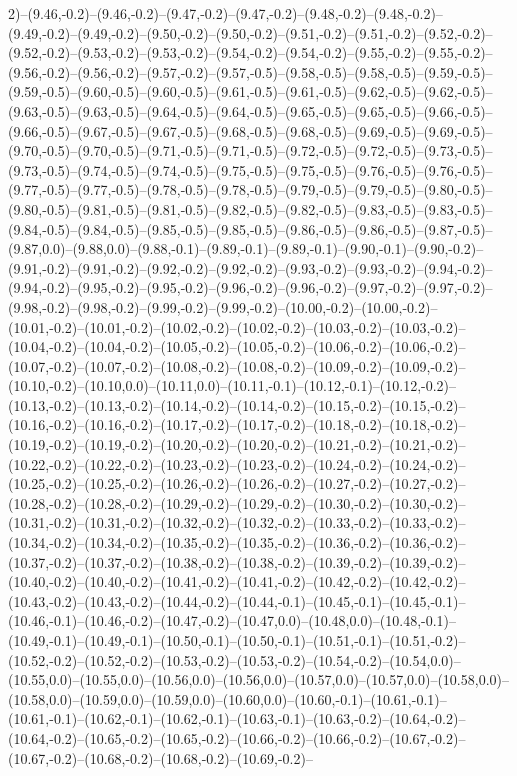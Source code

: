 2)--(9.46,-0.2)--(9.46,-0.2)--(9.47,-0.2)--(9.47,-0.2)--(9.48,-0.2)--(9.48,-0.2)--(9.49,-0.2)--(9.49,-0.2)--(9.50,-0.2)--(9.50,-0.2)--(9.51,-0.2)--(9.51,-0.2)--(9.52,-0.2)--(9.52,-0.2)--(9.53,-0.2)--(9.53,-0.2)--(9.54,-0.2)--(9.54,-0.2)--(9.55,-0.2)--(9.55,-0.2)--(9.56,-0.2)--(9.56,-0.2)--(9.57,-0.2)--(9.57,-0.5)--(9.58,-0.5)--(9.58,-0.5)--(9.59,-0.5)--(9.59,-0.5)--(9.60,-0.5)--(9.60,-0.5)--(9.61,-0.5)--(9.61,-0.5)--(9.62,-0.5)--(9.62,-0.5)--(9.63,-0.5)--(9.63,-0.5)--(9.64,-0.5)--(9.64,-0.5)--(9.65,-0.5)--(9.65,-0.5)--(9.66,-0.5)--(9.66,-0.5)--(9.67,-0.5)--(9.67,-0.5)--(9.68,-0.5)--(9.68,-0.5)--(9.69,-0.5)--(9.69,-0.5)--(9.70,-0.5)--(9.70,-0.5)--(9.71,-0.5)--(9.71,-0.5)--(9.72,-0.5)--(9.72,-0.5)--(9.73,-0.5)--(9.73,-0.5)--(9.74,-0.5)--(9.74,-0.5)--(9.75,-0.5)--(9.75,-0.5)--(9.76,-0.5)--(9.76,-0.5)--(9.77,-0.5)--(9.77,-0.5)--(9.78,-0.5)--(9.78,-0.5)--(9.79,-0.5)--(9.79,-0.5)--(9.80,-0.5)--(9.80,-0.5)--(9.81,-0.5)--(9.81,-0.5)--(9.82,-0.5)--(9.82,-0.5)--(9.83,-0.5)--(9.83,-0.5)--(9.84,-0.5)--(9.84,-0.5)--(9.85,-0.5)--(9.85,-0.5)--(9.86,-0.5)--(9.86,-0.5)--(9.87,-0.5)--(9.87,0.0)--(9.88,0.0)--(9.88,-0.1)--(9.89,-0.1)--(9.89,-0.1)--(9.90,-0.1)--(9.90,-0.2)--(9.91,-0.2)--(9.91,-0.2)--(9.92,-0.2)--(9.92,-0.2)--(9.93,-0.2)--(9.93,-0.2)--(9.94,-0.2)--(9.94,-0.2)--(9.95,-0.2)--(9.95,-0.2)--(9.96,-0.2)--(9.96,-0.2)--(9.97,-0.2)--(9.97,-0.2)--(9.98,-0.2)--(9.98,-0.2)--(9.99,-0.2)--(9.99,-0.2)--(10.00,-0.2)--(10.00,-0.2)--(10.01,-0.2)--(10.01,-0.2)--(10.02,-0.2)--(10.02,-0.2)--(10.03,-0.2)--(10.03,-0.2)--(10.04,-0.2)--(10.04,-0.2)--(10.05,-0.2)--(10.05,-0.2)--(10.06,-0.2)--(10.06,-0.2)--(10.07,-0.2)--(10.07,-0.2)--(10.08,-0.2)--(10.08,-0.2)--(10.09,-0.2)--(10.09,-0.2)--(10.10,-0.2)--(10.10,0.0)--(10.11,0.0)--(10.11,-0.1)--(10.12,-0.1)--(10.12,-0.2)--(10.13,-0.2)--(10.13,-0.2)--(10.14,-0.2)--(10.14,-0.2)--(10.15,-0.2)--(10.15,-0.2)--(10.16,-0.2)--(10.16,-0.2)--(10.17,-0.2)--(10.17,-0.2)--(10.18,-0.2)--(10.18,-0.2)--(10.19,-0.2)--(10.19,-0.2)--(10.20,-0.2)--(10.20,-0.2)--(10.21,-0.2)--(10.21,-0.2)--(10.22,-0.2)--(10.22,-0.2)--(10.23,-0.2)--(10.23,-0.2)--(10.24,-0.2)--(10.24,-0.2)--(10.25,-0.2)--(10.25,-0.2)--(10.26,-0.2)--(10.26,-0.2)--(10.27,-0.2)--(10.27,-0.2)--(10.28,-0.2)--(10.28,-0.2)--(10.29,-0.2)--(10.29,-0.2)--(10.30,-0.2)--(10.30,-0.2)--(10.31,-0.2)--(10.31,-0.2)--(10.32,-0.2)--(10.32,-0.2)--(10.33,-0.2)--(10.33,-0.2)--(10.34,-0.2)--(10.34,-0.2)--(10.35,-0.2)--(10.35,-0.2)--(10.36,-0.2)--(10.36,-0.2)--(10.37,-0.2)--(10.37,-0.2)--(10.38,-0.2)--(10.38,-0.2)--(10.39,-0.2)--(10.39,-0.2)--(10.40,-0.2)--(10.40,-0.2)--(10.41,-0.2)--(10.41,-0.2)--(10.42,-0.2)--(10.42,-0.2)--(10.43,-0.2)--(10.43,-0.2)--(10.44,-0.2)--(10.44,-0.1)--(10.45,-0.1)--(10.45,-0.1)--(10.46,-0.1)--(10.46,-0.2)--(10.47,-0.2)--(10.47,0.0)--(10.48,0.0)--(10.48,-0.1)--(10.49,-0.1)--(10.49,-0.1)--(10.50,-0.1)--(10.50,-0.1)--(10.51,-0.1)--(10.51,-0.2)--(10.52,-0.2)--(10.52,-0.2)--(10.53,-0.2)--(10.53,-0.2)--(10.54,-0.2)--(10.54,0.0)--(10.55,0.0)--(10.55,0.0)--(10.56,0.0)--(10.56,0.0)--(10.57,0.0)--(10.57,0.0)--(10.58,0.0)--(10.58,0.0)--(10.59,0.0)--(10.59,0.0)--(10.60,0.0)--(10.60,-0.1)--(10.61,-0.1)--(10.61,-0.1)--(10.62,-0.1)--(10.62,-0.1)--(10.63,-0.1)--(10.63,-0.2)--(10.64,-0.2)--(10.64,-0.2)--(10.65,-0.2)--(10.65,-0.2)--(10.66,-0.2)--(10.66,-0.2)--(10.67,-0.2)--(10.67,-0.2)--(10.68,-0.2)--(10.68,-0.2)--(10.69,-0.2)--